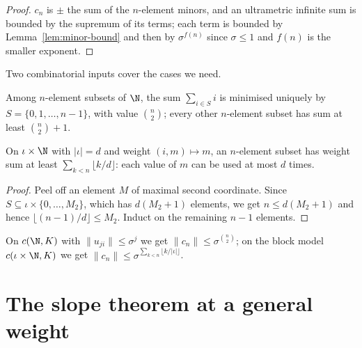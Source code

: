 \begin{proof}
  \leanok
  $c_n$ is $\pm$ the sum of the $n$-element minors, and an ultrametric infinite sum is bounded by
  the supremum of its terms; each term is bounded by Lemma~\ref{lem:minor-bound} and then by
  $\sigma^{f(n)}$ since $\sigma \leq 1$ and $f(n)$ is the smaller exponent.
\end{proof}

Two combinatorial inputs cover the cases we need.

\begin{lemma}
  \label{lem:choose-two}
  \leanok
  Among $n$-element subsets of $\N$, the sum $\sum_{i \in S} i$ is minimised uniquely by $S =
  \{0, 1, \dots, n-1\}$, with value $\binom{n}{2}$; every other $n$-element subset has sum at
  least $\binom{n}{2} + 1$.
\end{lemma}

\begin{lemma}
  \label{lem:block-weight}
  \leanok
  On $\iota \times \N$ with $\lvert \iota \rvert = d$ and weight $(i, m) \mapsto m$, an
  $n$-element subset has weight sum at least $\sum_{k < n} \lfloor k/d \rfloor$: each value of
  $m$ can be used at most $d$ times.
\end{lemma}

\begin{proof}
  \leanok
  Peel off an element $M$ of maximal second coordinate.  Since $S \subseteq \iota \times \{0,
  \dots, M_2\}$, which has $d(M_2+1)$ elements, we get $n \leq d(M_2+1)$ and hence $\lfloor
  (n-1)/d\rfloor \leq M_2$.  Induct on the remaining $n-1$ elements.
\end{proof}

\begin{corollary}
  \label{cor:slope-bound-block}
  \leanok
  On $c(\N, K)$ with $\lVert u_{ji}\rVert \leq \sigma^j$ we get $\lVert c_n \rVert \leq
  \sigma^{\binom{n}{2}}$; on the block model $c(\iota \times \N, K)$ we get $\lVert c_n \rVert
  \leq \sigma^{\sum_{k<n} \lfloor k/\lvert\iota\rvert\rfloor}$.
\end{corollary}

\section{The slope theorem at a general weight}

